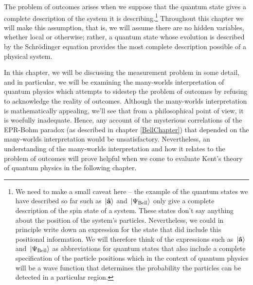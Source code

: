 The problem of outcomes arises when we suppose that the quantum state gives a complete description of the system it is describing.\footnote{We need to make a small caveat here -- the example of the quantum states we have described so far such as $\ket*{\vb{\hat{{a}}}}$ and $\ket*{\Psi_{\text{Bell}}}$ only give a complete description of the spin state of a system. These states don't say anything about the position of the system's particles. Nevertheless, we could in principle write down an expression for the state that did include this positional information. We will therefore think of the expressions such as $\ket*{\vb{\hat{{a}}}}$ and $\ket*{\Psi_{\text{Bell}}}$ as abbreviations for quantum states that also include a complete specification of the particle positions which in the context of quantum physics will be a wave function that determines the probability the particles can be detected in a particular region.} Throughout this chapter we will make this assumption, that is, we will assume there are no hidden variables, whether local or otherwise; rather, a quantum state whose evolution is described by the Schr\"{o}dinger equation provides the most complete description possible of a physical system.

In this chapter, we will be discussing the measurement problem in some detail, and in particular, we will be examining the many-worlds interpretation of quantum physics which attempts to sidestep the problem of outcomes by refusing to acknowledge the reality of outcomes. Although the many-worlds interpretation is mathematically appealing, we'll see that from a philosophical point of view, it is woefully inadequate. Hence, any account of the mysterious correlations of the EPR-Bohm paradox (as described in chapter \ref{BellChapter}) that depended on the many-worlds interpretation would be unsatisfactory. Nevertheless, an understanding of the many-worlds interpretation and how it relates to the problem of outcomes will prove helpful when we come to evaluate Kent's theory of quantum physics in the following chapter. 